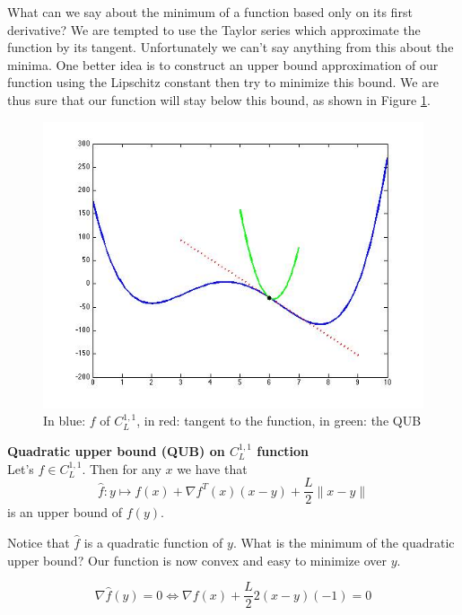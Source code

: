 What can we say about the minimum of a function based only on its first derivative? We are tempted to use the Taylor series which approximate the function by its tangent.  Unfortunately  we can't say anything from this about the minima. One better idea is to construct an upper bound approximation of our function using the Lipschitz constant then try to minimize this bound. We are thus sure that our function will stay below this bound, as shown in Figure \ref{5:fig1}. 

\begin{figure}[h]
\begin{center}
\includegraphics[scale=0.6]{./images/Course5_construction} 
\caption{In blue: $f$ of $C_L^{1,1}$, in red: tangent to the function, in green: the QUB}
\label{5:fig1}
\end{center}
\end{figure}

\begin{lemma}
\textbf{Quadratic upper bound (QUB) on $C_L^{1,1}$ function} \\
Let's $f \in C_L^{1,1}$. Then for any $x$ we have that 
$$ \hat{f}: y \mapsto  f(x)+ \nabla f^T(x)(x-y)+ \frac{L}{2} \| x-y\| $$
 is an upper bound of $f(y)$.
\end{lemma}

Notice that $\hat{f}$ is a quadratic function of $y$.  What is the minimum of the quadratic upper bound? Our function is now convex and easy to minimize over $y$.


$$\nabla \hat{f}(y)=0 \Leftrightarrow  \nabla f(x) +\frac{L}{2} 2(x-y)(-1)=0$$

